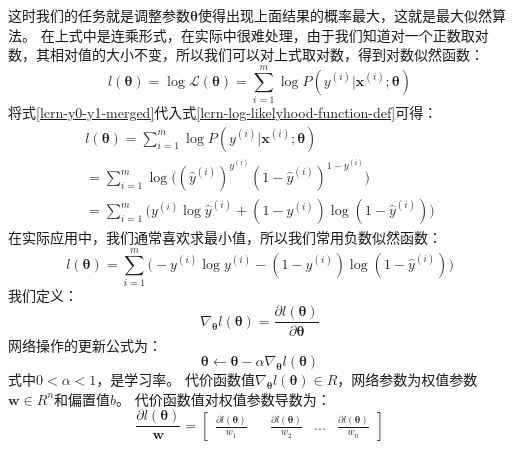 \documentclass[UTF8]{article}
\begin{document}
这时我们的任务就是调整参数$\boldsymbol{\theta}$使得出现上面结果的概率最大，这就是最大似然算法。\newline
在上式中是连乘形式，在实际中很难处理，由于我们知道对一个正数取对数，其相对值的大小不变，所以我们可以对上式取对数，得到对数似然函数：
\begin{equation}
l(\boldsymbol{\theta}) = \log \mathcal{L}(\boldsymbol{\theta}) = \sum_{i=1}^{m} \log P( y^{(i)} \vert \boldsymbol{x}^{(i)}; \boldsymbol{\theta} )
\label{lcrn-log-likelyhood-function-def}
\end{equation}
将式\ref{lcrn-y0-y1-merged}代入式\ref{lcrn-log-likelyhood-function-def}可得：
\begin{equation}
\begin{aligned}
l(\boldsymbol{\theta}) = \sum_{i=1}^{m} \log P( y^{(i)} \vert \boldsymbol{x}^{(i)}; \boldsymbol{\theta} ) \\
= \sum_{i=1}^{m} \log \Big(  (\hat{y}^{(i)})^{y^{(i)}} ( 1 - \hat{y}^{(i)} )^{1-y^{(i)}} \Big) \\
= \sum_{i=1}^{m} \Big( y^{(i)} \log \hat{y}^{(i)} + (1-y^{(i)})\log(1 - \hat{y}^{(i)}) \Big)
\end{aligned}
\label{lcrn-log-likelyhood-function-simplified}
\end{equation}
在实际应用中，我们通常喜欢求最小值，所以我们常用负数似然函数：
\begin{equation}
l(\boldsymbol{\theta}) = \sum_{i=1}^{m} \Big( -y^{(i)} \log \hat{y^{(i)}} - (1-y^{(i)})\log(1 - \hat{y}^{(i)}) \Big)
\label{lcrn-negative-log-likelyhood-function-simplified}
\end{equation}
我们定义：
\begin{equation}
\nabla_{\boldsymbol{\theta}} l(\boldsymbol{\theta}) = \frac{\partial{l(\boldsymbol{\theta})}}{\partial{\boldsymbol{\theta}}}
\label{lcrn-nll-gradient-symbol}
\end{equation}
网络操作的更新公式为：
\begin{equation}
\boldsymbol{\theta} \leftarrow \boldsymbol{\theta} - \alpha \nabla_{\boldsymbol{\theta}} l(\boldsymbol{\theta})
\label{lcrn-parameter-update-formala}
\end{equation}
式中$0<\alpha<1$，是学习率。\newline
代价函数值$\nabla_{\boldsymbol{\theta}}l(\boldsymbol{\theta}) \in R$，网络参数为权值参数$\boldsymbol{w} \in R^{n}$和偏置值$b$。\newline
代价函数值对权值参数导数为：
\begin{equation}
\frac{ \partial{l(\boldsymbol{\theta})} }{ \boldsymbol{w} } = \begin{bmatrix}
\frac{ \partial{l(\boldsymbol{\theta})} } { w_{1} } && \frac{ \partial{l(\boldsymbol{\theta})} } { w_{2} } & ... & \frac{ \partial{l(\boldsymbol{\theta})} } { w_{n} }
\end{bmatrix}
\label{lcrn-nll-vs-w-gradient-vector}
\end{equation}
\end{document}
